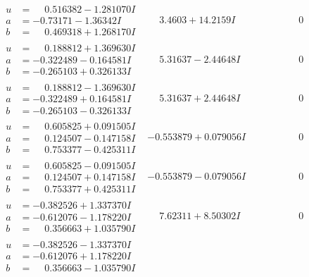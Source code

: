 \documentclass[1p]{elsarticle_modified}
\theoremstyle{definition}
\begin{document}
$$\begin{array}{c|c|c}
\begin{aligned}
u &= \phantom{-}0.516382 - 1.281070 I \\
a &= -0.73171 - 1.36342 I \\
b &= \phantom{-}0.469318 + 1.268170 I\end{aligned}
 & \phantom{-}3.4603 + 14.2159 I & \phantom{-0.000000 } 0 \\ \hline\begin{aligned}
u &= \phantom{-}0.188812 + 1.369630 I \\
a &= -0.322489 - 0.164581 I \\
b &= -0.265103 + 0.326133 I\end{aligned}
 & \phantom{-}5.31637 - 2.44648 I & \phantom{-0.000000 } 0 \\ \hline\begin{aligned}
u &= \phantom{-}0.188812 - 1.369630 I \\
a &= -0.322489 + 0.164581 I \\
b &= -0.265103 - 0.326133 I\end{aligned}
 & \phantom{-}5.31637 + 2.44648 I & \phantom{-0.000000 } 0 \\ \hline\begin{aligned}
u &= \phantom{-}0.605825 + 0.091505 I \\
a &= \phantom{-}0.124507 - 0.147158 I \\
b &= \phantom{-}0.753377 - 0.425311 I\end{aligned}
 & -0.553879 + 0.079056 I & \phantom{-0.000000 } 0 \\ \hline\begin{aligned}
u &= \phantom{-}0.605825 - 0.091505 I \\
a &= \phantom{-}0.124507 + 0.147158 I \\
b &= \phantom{-}0.753377 + 0.425311 I\end{aligned}
 & -0.553879 - 0.079056 I & \phantom{-0.000000 } 0 \\ \hline\begin{aligned}
u &= -0.382526 + 1.337370 I \\
a &= -0.612076 - 1.178220 I \\
b &= \phantom{-}0.356663 + 1.035790 I\end{aligned}
 & \phantom{-}7.62311 + 8.50302 I & \phantom{-0.000000 } 0 \\ \hline\begin{aligned}
u &= -0.382526 - 1.337370 I \\
a &= -0.612076 + 1.178220 I \\
b &= \phantom{-}0.356663 - 1.035790 I\end{aligned}

\end{array}$$
\end{document}
